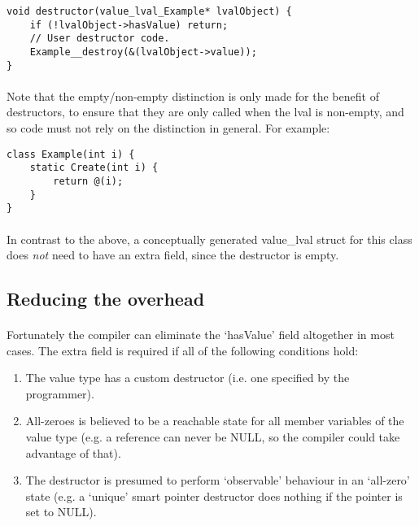 \documentclass[12pt,twoside,notitlepage]{report}
\begin{document}
\begin{lstlisting}
void destructor(value_lval_Example* lvalObject) {
	if (!lvalObject->hasValue) return;
	// User destructor code.
	Example__destroy(&(lvalObject->value));
}
\end{lstlisting}

\paragraph{}
Note that the empty/non-empty distinction is only made for the benefit of destructors, to ensure that they are only called when the lval is non-empty, and so code must not rely on the distinction in general. For example:

\begin{lstlisting}
class Example(int i) {
	static Create(int i) {
		return @(i);
	}
}
\end{lstlisting}

\paragraph{}
In contrast to the above, a conceptually generated value\_lval struct for this class does \emph{not} need to have an extra field, since the destructor is empty.

\subsection{Reducing the overhead}

\paragraph{}
Fortunately the compiler can eliminate the `hasValue' field altogether in most cases. The extra field is required if all of the following conditions hold:

\begin{enumerate}
\item The value type has a custom destructor (i.e. one specified by the programmer).
\item All-zeroes is believed to be a reachable state for all member variables of the value type (e.g. a reference can never be NULL, so the compiler could take advantage of that).
\item The destructor is presumed to perform `observable' behaviour in an `all-zero' state (e.g. a `unique' smart pointer destructor does nothing if the pointer is set to NULL).
\end{enumerate}
\end{document}
